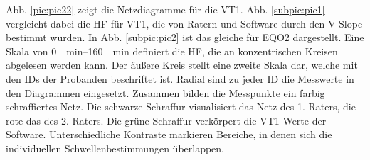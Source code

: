 %
Abb. \ref{pic:pic22} zeigt die Netzdiagramme für die VT1. Abb. \ref{subpic:pic1} vergleicht dabei die \acs{HF} für VT1, die von Ratern und Software durch den V-Slope bestimmt wurden. In Abb. \ref{subpic:pic2} ist das gleiche für \acs{EQO2} dargestellt. Eine Skala von \SIrange{0}{160}{\per\minute} definiert die \acs{HF}, die an konzentrischen Kreisen abgelesen werden kann. Der äußere Kreis stellt eine zweite Skala dar, welche mit den IDs der Probanden beschriftet ist. Radial sind zu jeder ID die Messwerte in den Diagrammen eingesetzt. Zusammen bilden die Messpunkte ein farbig schraffiertes Netz. Die schwarze Schraffur visualisiert das Netz des 1. Raters, die rote das des 2. Raters. Die grüne Schraffur verkörpert die VT1-Werte der Software. Unterschiedliche Kontraste markieren Bereiche, in denen sich die individuellen Schwellenbestimmungen überlappen.

